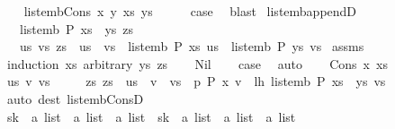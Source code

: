 \begin{isabellebody}
\isamarkupfalse%
\isanewline
\ \ \isamarkupfalse%
\ {\isacharparenleft}list{\isacharunderscore}emb{\isacharunderscore}Cons{}\ x\ y\ xs\ ys{\isacharparenright}\isanewline
\ \ \isamarkupfalse%
\ \isamarkupfalse%
\ {\isacharquery}case\ \isamarkupfalse%
\ blast\isanewline
{}\isamarkupfalse%
%
\endisatagproof
{\isafoldproof}%
%
\isadelimproof
\isanewline
%
\endisadelimproof
\isanewline
{}\isamarkupfalse%
\ list{\isacharunderscore}emb{\isacharunderscore}appendD{\isacharcolon}\isanewline
\ \ \ {\isachardoublequoteopen}list{\isacharunderscore}emb\ P\ {\isacharparenleft}xs\ {\isacharat}\ ys{\isacharparenright}\ zs{\isachardoublequoteclose}\isanewline
\ \ \ {\isachardoublequoteopen}{\isasymexists}us\ vs{\isachardot}\ zs\ {\isacharequal}\ us\ {\isacharat}\ vs\ {\isasymand}\ list{\isacharunderscore}emb\ P\ xs\ us\ {\isasymand}\ list{\isacharunderscore}emb\ P\ ys\ vs{\isachardoublequoteclose}\isanewline
%
\isadelimproof
%
\endisadelimproof
%
\isatagproof
{}\isamarkupfalse%
\ assms\isanewline
{}\isamarkupfalse%
\ {\isacharparenleft}induction\ xs\ arbitrary{\isacharcolon}\ ys\ zs{\isacharparenright}\isanewline
\ \ \isamarkupfalse%
\ Nil\ \isamarkupfalse%
\ \isamarkupfalse%
\ {\isacharquery}case\ \isamarkupfalse%
\ auto\isanewline
{}\isamarkupfalse%
\isanewline
\ \ \isamarkupfalse%
\ {\isacharparenleft}Cons\ x\ xs{\isacharparenright}\isanewline
\ \ \isamarkupfalse%
\ \isamarkupfalse%
\ us\ v\ vs\ \isanewline
\ \ \ \ zs{\isacharcolon}\ {\isachardoublequoteopen}zs\ {\isacharequal}\ us\ {\isacharat}\ v\ {\isacharhash}\ vs{\isachardoublequoteclose}\ \ p{\isacharcolon}\ {\isachardoublequoteopen}P\ x\ v{\isachardoublequoteclose}\ \ lh{\isacharcolon}\ {\isachardoublequoteopen}list{\isacharunderscore}emb\ P\ {\isacharparenleft}xs\ {\isacharat}\ ys{\isacharparenright}\ vs{\isachardoublequoteclose}\isanewline
\ \ \ \ \isamarkupfalse%
\ {\isacharparenleft}auto\ dest{\isacharcolon}\ list{\isacharunderscore}emb{\isacharunderscore}ConsD{\isacharparenright}\isanewline
\ \ \isamarkupfalse%
\ sk\ {\isacharcolon}{\isacharcolon}\ {\isachardoublequoteopen}{\isacharprime}a\ list\ {\isasymRightarrow}\ {\isacharprime}a\ list\ {\isasymRightarrow}\ {\isacharprime}a\ list{\isachardoublequoteclose}\ \ sk\ {\isacharcolon}{\isacharcolon}\ {\isachardoublequoteopen}{\isacharprime}a\ list\ {\isasymRightarrow}\ {\isacharprime}a\ list\ {\isasymRightarrow}\ {\isacharprime}a\ list{\isachardoublequoteclose}\ \isanewline

\end{isabellebody}
